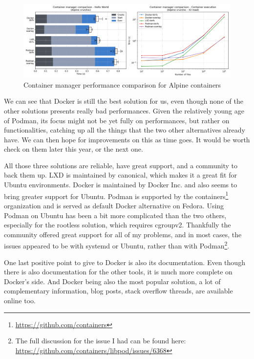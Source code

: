 \begin{figure}[h!]
  \begin{center}
    \includegraphics[width=\linewidth]{images/question-1-manager.png}
    \caption{Container manager performance comparison for Alpine containers}
    \label{fig:q1:manager}
  \end{center}
\end{figure}

We can see that Docker is still the best solution for us, even though none of the other solutions presents really bad performances.  Given the relatively young age of Podman, its focus might not be yet fully on performances, but rather on functionalities, catching up all the things that the two other alternatives already have.  We can then hope for improvements on this as time goes.  It would be worth check on them later this year, or the next one.  

All those three solutions are reliable, have great support, and a community to back them up.  LXD is maintained by canonical, which makes it a great fit for Ubuntu environments.  Docker is maintained by Docker Inc. and also seems to bring greater support for Ubuntu.  Podman is supported by the containers\footnote{\href{https://github.com/containers}{https://github.com/containers}} organization and is served as default Docker alternative on Fedora.  Using Podman on Ubuntu has been a bit more complicated than the two others, especially for the rootless solution, which requires cgroupv2.  Thankfully the community offered great support for all of my problems, and in most cases, the issues appeared to be with systemd or Ubuntu, rather than with Podman\footnote{The full discussion for the issue I had can be found here: \href{https://github.com/containers/libpod/issues/6368}{https://github.com/containers/libpod/issues/6368}}.

One last positive point to give to Docker is also its documentation.  Even though there is also documentation for the other tools, it is much more complete on Docker's side.  And Docker being also the most popular solution, a lot of complementary information, blog posts, stack overflow threads, are available online too.


